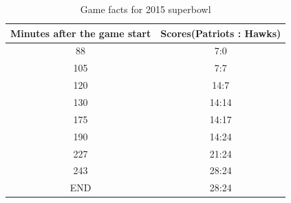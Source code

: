 \documentclass{article}
\begin{document}
\begin{table}[hbp]
\caption{Game facts for 2015 superbowl}
\begin{center}
\label{tb:game}
\begin{tabular}{|c|c|}
\hline
Minutes after the game start & Scores(Patriots : Hawks)\\
\hline
88&7:0\\
\hline
105&7:7\\
\hline
120&14:7\\
\hline
130&14:14\\
\hline
175&14:17\\
\hline
190&14:24\\
\hline
227&21:24\\
\hline
243&28:24\\
\hline
END&28:24\\
\hline
\end{tabular}
\end{center}
\end{table}
\end{document}
